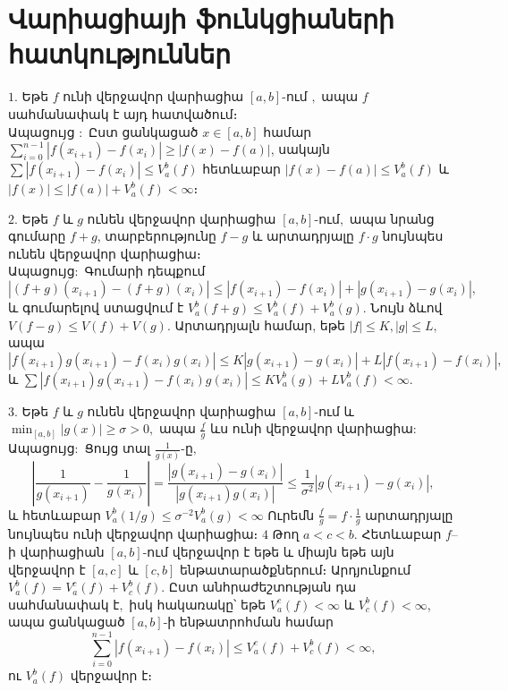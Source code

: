 \documentclass[12pt]{article}
\begin{document}
\section{Վարիացիայի ֆունկցիաների հատկություններ}
\begin{description}
\item \(1.\) Եթե \(f\) ունի վերջավոր վարիացիա  \([a,b]\)-ում \(,\) ապա \(f\) սահմանափակ է այդ հատվածում։
\\
Ապացույց \(:\) Ըստ ցանկացած \(x\in[a,b]\) համար
\(\sum_{i=0}^{n-1}|f(x_{i+1})-f(x_i)| \ge |f(x)-f(a)|\),
սակայն \(\sum|f(x_{i+1})-f(x_i)| \le V_a^b(f)\) հետևաբար \(|f(x)-f(a)|\le V_a^b(f)\) և \(|f(x)|\le |f(a)|+V_a^b(f) < \infty\)։
\item\(2.\) Եթե \(f\) և \(g\) ունեն վերջավոր վարիացիա \([a, b]\)-ում\(,\) ապա նրանց գումարը \(f+g\), տարբերությունը \(f-g\) և արտադրյալը \(f\cdot g\) նույնպես ունեն վերջավոր վարիացիա։
\\
Ապացույց\(:\) Գումարի դեպքում
\[
|(f+g)(x_{i+1})-(f+g)(x_i)| \le |f(x_{i+1})-f(x_i)| + |g(x_{i+1})-g(x_i)|,
\]
և գումարելով ստացվում է \(V_a^b(f+g)\le V_a^b(f)+V_a^b(g)\)\(.\) Նույն ձևով \(V(f-g)\le V(f)+V(g)\). Արտադրյալն համար, եթե \(|f|\le K, |g|\le L\)\(,\) ապա
\[
|f(x_{i+1})g(x_{i+1}) - f(x_i)g(x_i)| \le K|g(x_{i+1})-g(x_i)| + L|f(x_{i+1})-f(x_i)|,
\]
և \(\sum |f(x_{i+1})g(x_{i+1}) - f(x_i)g(x_i)| \le K V_a^b(g) + L V_a^b(f) < \infty\)\(.\)
\item\(3.\) Եթե \(f\) և \(g\) ունեն վերջավոր վարիացիա \([a, b]\)-ում և \(\min_{[a,b]}|g(x)|\ge\sigma>0\)\(,\) ապա \(\frac{f}{g}\) ևս ունի վերջավոր վարիացիա\(:\)
\\
Ապացույց\(:\) Ցույց տալ \(\frac{1}{g(x)}\)-ը\(,\)
\[
\left|\frac{1}{g(x_{i+1})}-\frac{1}{g(x_i)}\right| = \frac{|g(x_{i+1})-g(x_i)|}{|g(x_{i+1})g(x_i)|} \le \frac{1}{\sigma^2}|g(x_{i+1})-g(x_i)|,
\]
և հետևաբար \(V_a^b(1/g)\le \sigma^{-2}V_a^b(g)<\infty\) Ուրեմն \(\frac{f}{g}=f\cdot\frac1g\) արտադրյալը նույնպես ունի վերջավոր վարիացիա։
\(4\) Թող \(a<c<b\). Հետևաբար \(f\)–ի վարիացիան \([a,b]\)-ում վերջավոր է եթե և միայն եթե այն վերջավոր է \([a,c]\) և \([c, b]\) ենթատարածքներում։ Արդյունքում \(V_a^b(f)=V_a^c(f)+V_c^b(f)\)\(.\)
Ըստ անհրաժեշտության դա սահմանափակ է\(,\) իսկ հակառակը՝ եթե \(V_a^c(f)<\infty\) և \(V_c^b(f)<\infty\), ապա ցանկացած \([a,b]\)-ի ենթատրոհման համար
\[
\sum_{i=0}^{n-1}|f(x_{i+1})-f(x_i)| \le V_a^c(f) + V_c^b(f)<\infty,
\]
ու \(V_a^b(f)\) վերջավոր է։
\end{description}
\end{document}
